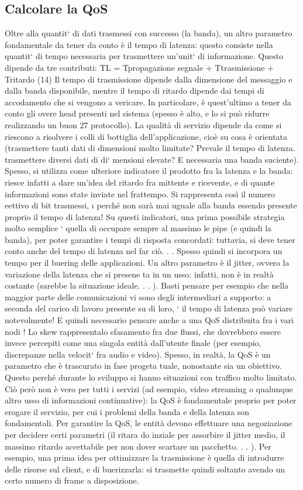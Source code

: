 \subsection{Calcolare la QoS}
Oltre alla quantit` di dati trasmessi con successo (la banda), un altro parametro
fondamentale da tener da conto è il tempo di latenza: questo consiste nella
quantit` di tempo necessaria per trasmettere un'unit` di informazione. Questo
dipende da tre contributi:
TL = Tpropagazione segnale + Ttrasmissione + Tritardo
(14)
Il tempo di trasmissione dipende dalla dimensione del messaggio e dalla banda
disponibile, mentre il tempo di ritardo dipende dai tempi di accodamento che
si vengono a vericare. In particolare, è quest'ultimo a tener da conto gli overe
head presenti nel sistema (spesso è alto, e lo si può ridurre realizzando un buon
27
protocollo).
La qualità di servizio dipende da come si riescono a risolvere i colli di bottiglia
dell'applicazione, cioè su cosa è orientata (trasmettere tanti dati di dimensioni
molto limitate? Prevale il tempo di latenza. trasmettere diversi dati di di`
mensioni elevate? E necessaria una banda suciente). Spesso, si utilizza come
ulteriore indicatore il prodotto fra la latenza e la banda: riesce infatti a dare
un'idea del ritardo fra mittente e ricevente, e di quante informazioni sono state
inviate nel frattempo. Si rappresenta così il numero eettivo di bit trasmessi,
\i{}
perché non sarà mai uguale alla banda essendo presente proprio il tempo di
latenza! Su questi indicatori, una prima possibile strategia molto semplice `
quella di occupare sempre al massimo le pipe (e quindi la banda), per poter
garantire i tempi di risposta concordati: tuttavia, si deve tener conto anche
del tempo di latenza nel far ciò. . . Spesso quindi si incorpora un tempo per il
buering delle applicazioni.
Un altro parametro è il jitter, ovvero la variazione della latenza che si presene
ta in un usso: infatti, non è in realtà costante (sarebbe la situazione ideale. . . ).
Basti pensare per esempio che nella maggior parte delle comunicazioni vi sono
degli intermediari a supporto: a seconda del carico di lavoro presente su di loro,
`
il tempo di latenza può variare notevolmente! E quindi necessario pensare anche
a una QoS distribuita fra i vari nodi !
Lo skew rappresentalo sfasamento fra due flussi, che dovrebbero essere invece
percepiti come una singola entità dall'utente finale (per esempio, discrepanze
nella velocit` fra audio e video).
Spesso, in realtà, la QoS è un parametro che è trascurato in fase progeta
tuale, nonostante sia un obiettivo. Questo perché durante lo sviluppo si hanno
situazioni con traffico molto limitato. Ciò però non è vero per tutti i servizi
(ad esempio, video streaming o qualunque altro usso di informazioni continuative): la QoS è fondamentale proprio per
poter erogare il servizio, per cui i
problemi della banda e della latenza son fondamentali. Per garantire la QoS, le
entità devono effettuare una negoziazione per decidere certi parametri (il ritara
do inziale per assorbire il jitter medio, il massimo ritardo accettabile per non
dover scartare un pacchetto. . . ). Per esempio, una prima idea per ottimizzare
la trasmissione è quella di introdurre delle risorse sul client, e di buerizzarla:
si trasmette quindi soltanto avendo un certo numero di frame a disposizione.
